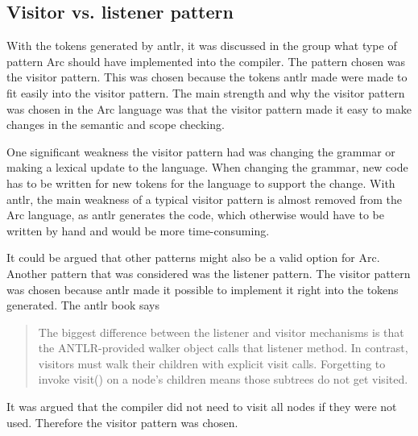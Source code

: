 \subsection{Visitor vs. listener pattern}

With the tokens generated by \gls{antlr}, it was discussed in the group what type of pattern Arc should have implemented into the compiler. The pattern chosen was the visitor pattern. This was chosen because the tokens \gls{antlr} made were made to fit easily into the visitor pattern.
The main strength and why the visitor pattern was chosen in the Arc language was that the visitor pattern made it easy to make changes in the semantic and scope checking. 

One significant weakness the visitor pattern had was changing the grammar or making a lexical update to the language. When changing the grammar, new code has to be written for new tokens for the language to support the change. With \gls{antlr}, the main weakness of a typical visitor pattern is almost removed from the Arc language, as \gls{antlr} generates the code, which otherwise would have to be written by hand and would be more time-consuming. 


It could be argued that other patterns might also be a valid option for Arc. Another pattern that was considered was the listener pattern. The visitor pattern was chosen because \gls{antlr} made it possible to implement it right into the tokens generated. The \gls{antlr} book says \begin{quote}
    The biggest difference between the listener and visitor mechanisms is that the ANTLR-provided walker object calls that listener method. In contrast, visitors must walk their children with explicit visit calls. Forgetting to invoke visit() on a node’s children means those subtrees do not get visited. \cite{Parr2014}
\end{quote}
It was argued that the compiler did not need to visit all nodes if they were not used. Therefore the visitor pattern was chosen.
 






